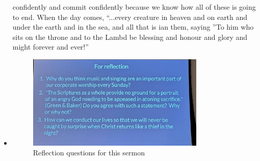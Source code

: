 \begin{itemize}
{  confidently and commit confidently because we know how all of these is
  going to end.  When the day comes, ``...every creature in heaven and on
  earth and under the earth and in the sea, and all that is ian them, saying
  ''To him who sits on the throne and to the Lambd be blessing and honour and
  glory and might forever and ever!''}
  \item{\begin{figure}[H]
    \centering
    \includegraphics[width=0.8\textwidth, trim={0cm 0cm 0cm 0cm},clip]{Figures/marchSermon4Reflections.jpg}
    \caption[]{Reflection questions for this sermon}
  \end{figure}}
\end{itemize}